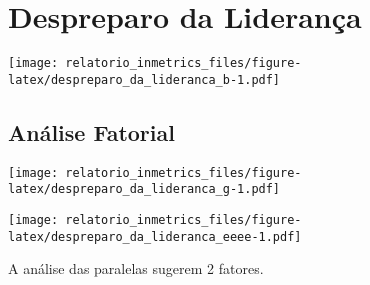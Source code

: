 \documentclass[]{book}
\begin{document}
\hypertarget{despreparo-da-lideranca}{%
\section{Despreparo da Liderança}\label{despreparo-da-lideranca}}

\texttt{[image: relatorio\_inmetrics\_files/figure-latex/despreparo\_da\_lideranca\_b-1.pdf]}

\hypertarget{analise-fatorial-1}{%
\subsection{Análise Fatorial}\label{analise-fatorial-1}}

\texttt{[image: relatorio\_inmetrics\_files/figure-latex/despreparo\_da\_lideranca\_g-1.pdf]}

\texttt{[image: relatorio\_inmetrics\_files/figure-latex/despreparo\_da\_lideranca\_eeee-1.pdf]}

A análise das paralelas sugerem 2 fatores.
\end{document}
